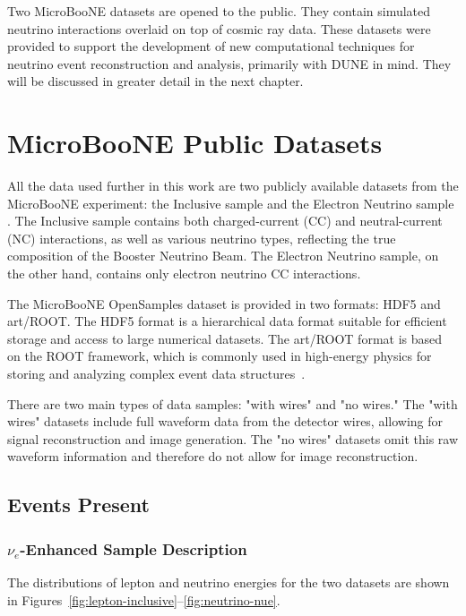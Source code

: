 \documentclass{pracalicmgr}
\begin{document}
Two MicroBooNE datasets are opened to the public. They contain simulated neutrino interactions overlaid on top of cosmic ray data. These datasets were provided to support the development of new computational techniques for neutrino event reconstruction and analysis, primarily with DUNE in mind. They will be discussed in greater detail in the next chapter.

\chapter{MicroBooNE Public Datasets}

All the data used further in this work are two publicly available datasets from the MicroBooNE experiment: the Inclusive sample and the Electron Neutrino sample \cite{ubooneOpenSamples}. The Inclusive sample contains both charged-current (CC) and neutral-current (NC) interactions, as well as various neutrino types, reflecting the true composition of the Booster Neutrino Beam. The Electron Neutrino sample, on the other hand, contains only electron neutrino CC interactions.

The MicroBooNE OpenSamples dataset is provided in two formats: HDF5 and art/ROOT. The HDF5 format is a hierarchical data format suitable for efficient storage and access to large numerical datasets. The art/ROOT format is based on the ROOT framework, which is commonly used in high-energy physics for storing and analyzing complex event data structures~\cite{hdf5,root}. 

There are two main types of data samples: "with wires" and "no wires." The "with wires" datasets include full waveform data from the detector wires, allowing for signal reconstruction and image generation. The "no wires" datasets omit this raw waveform information and therefore do not allow for image reconstruction.

\section{Events Present}

\subsection{\texorpdfstring{$\nu_e$}{νₑ}-Enhanced Sample Description}

The distributions of lepton and neutrino energies for the two datasets are shown in Figures~\ref{fig:lepton-inclusive}--\ref{fig:neutrino-nue}. 
\end{document}
